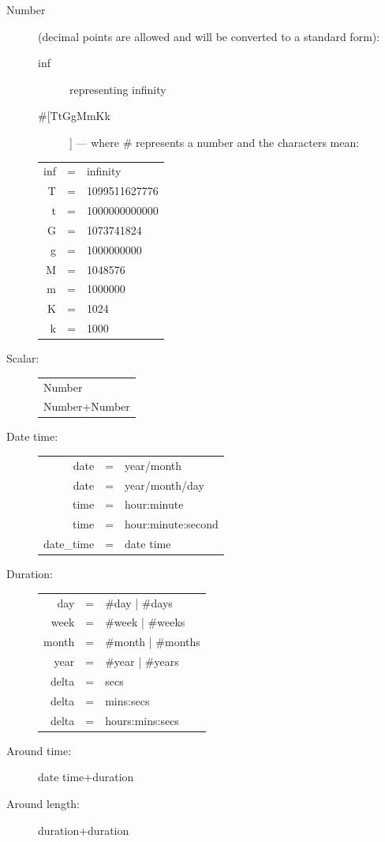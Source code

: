 	\begin{description}
	\item[Number] (decimal points are allowed and will be converted to a standard form):
    	\begin{description}
       	 \item[inf] representing infinity
       	 \item[\#[TtGgMmKk]]  ---  where \# represents a number and the characters mean:
    	\end{description}

    \begin{tabular}{rcl}
        inf&=& infinity\\
        T&=&1099511627776\\
        t&=&1000000000000\\
        G&=&1073741824\\
        g&=&1000000000\\
        M&=&1048576\\
        m&=&1000000\\
        K&=&1024\\
        k&=&1000\\
    \end{tabular}

\item[Scalar:] 

    \begin{tabular}{l}
        Number\\
        Number+Number\\
    \end{tabular}
\item[Date time:]
    \begin{tabular}{rcl}
        date&=&year/month\\
        date&=&year/month/day\\
        time&=&hour:minute\\
        time&=&hour:minute:second\\
        date\_time&=&date time\\
    \end{tabular}

  \item[Duration:]
      \begin{tabular}{rcl}
    day  &=&	\#day 	  | \#days\\
    week &=&	\#week 	  | \#weeks\\
    month&=&	\#month | \#months\\
    year &=&	\#year	  | \#years\\
    delta&=&secs\\
    delta&=&mins:secs\\
    delta&=&hours:mins:secs\\
      \end{tabular}

\item[Around time:]
    date time+duration

  \item[Around length:]
    duration+duration

\end{description}

